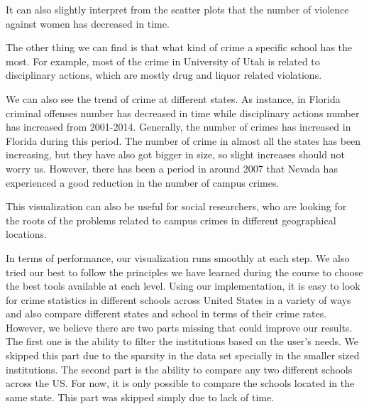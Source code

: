\documentclass[12pt]{article}
\begin{document}
It can also slightly interpret from the scatter plots that the number of violence against women has decreased in time. 

The other thing we can find is that what kind of crime a specific school has the most. For example, most of the crime in University of Utah is related to disciplinary actions, which are mostly drug and liquor related violations. 

We can also see the trend of crime at different states. As instance, in Florida criminal offenses number has decreased in time while disciplinary actions number has increased from 2001-2014. Generally, the number of crimes has increased in Florida during this period. The number of crime in almost all the states has been increasing, but they have also got bigger in size, so slight increases should not worry us. However, there has been a period in around 2007 that Nevada has experienced a good reduction in the number of campus crimes.

This visualization can also be useful for social researchers, who are looking for the roots of the problems related to campus crimes in different geographical locations.

In terms of performance, our visualization runs smoothly at each step. We also tried our best to follow the principles we have learned during the course to choose the best tools available at each level. Using our implementation, it is easy to look for crime statistics in different schools across United States in a variety of ways and also compare different states and school in terms of their crime rates. However, we believe there are two parts missing that could improve our results. The first one is the ability to filter the institutions based on the user's needs. We skipped this part due to the sparsity in the data set specially in the smaller sized institutions. The second part is the ability to compare any two different schools across the US. For now, it is only possible to compare the schools located in the same state. This part was skipped simply due to lack of time.

\end{document}
